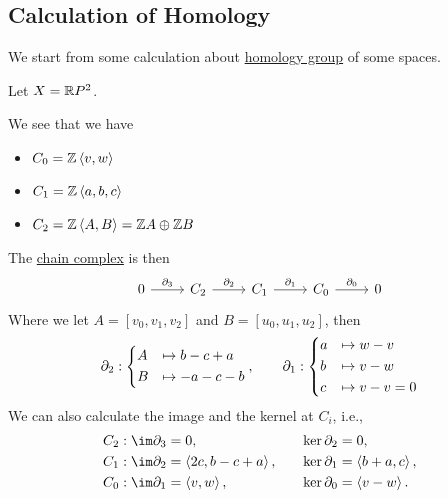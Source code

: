\subsection{Calculation of Homology}
We start from some calculation about \hyperref[def:homology-group]{homology group} of some spaces.
\begin{eg}
	Let \(X = \mathbb{\MakeUppercase{r}} P^{2} \).
	\begin{figure}[H]
		\centering
		\label{fig:eg:homology-RP2}
	\end{figure}
	We see that we have
	\begin{itemize}
		\item \(C_0 = \mathbb{\MakeUppercase{z}} \left< v, w \right> \)
		\item \(C_1 = \mathbb{\MakeUppercase{z}} \left< a, b, c \right> \)
		\item \(C_2 = \mathbb{\MakeUppercase{z}} \left< A, B \right> = \mathbb{\MakeUppercase{z}} A \oplus \mathbb{\MakeUppercase{z}} B\)
	\end{itemize}
	The \hyperref[def:chain-complex]{chain complex} is then
	\[
		\begin{tikzcd}
			0 & {C_2} & {C_1} & {C_0} & 0
			\arrow["{\partial_3}", from=1-1, to=1-2]
			\arrow["{\partial_2}", from=1-2, to=1-3]
			\arrow["{\partial_1}", from=1-3, to=1-4]
			\arrow["{\partial_0}", from=1-4, to=1-5]
		\end{tikzcd}
	\]
	Where we let \(A = [v_0, v_1, v_2]\) and \(B = [u_0, u_1, u_2]\), then
	\[
		\partial_2: \begin{dcases}
			A & \mapsto b - c + a \\
			B & \mapsto -a-c-b    \\
		\end{dcases},\qquad \partial_1: \begin{dcases}
			a & \mapsto w - v     \\
			b & \mapsto v - w     \\
			c & \mapsto v - v = 0 \\
		\end{dcases}
	\]
	We can also calculate the image and the kernel at \(C_{i} \), i.e.,
	\[
		\begin{alignedat}{3}
			C_2&: \im \partial _3 = 0, &\ker \partial _2 &= 0, \\
			C_1&: \im \partial _2 = \left< 2c, b - c + a \right> , \qquad&\ker \partial _1 &= \left< b +a, c \right>,\\
			C_0&: \im \partial _1 = \left< v, w\right> , &\ker \partial _0 &= \left< v - w\right>.

\end{alignedat}\]
\end{eg}

